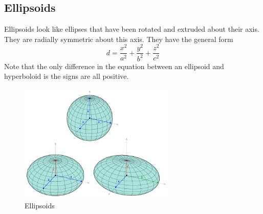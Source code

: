 \subsection{Ellipsoids}
\noindent
Ellipsoids look like ellipses that have been rotated and extruded about their axis.
They are radially symmetric about this axis.
They have the general form 
\begin{equation*}
	d = \frac{x^2}{a^2} + \frac{y^2}{b^2} + \frac{z^2}{c^2}	
\end{equation*}
Note that the only difference in the equation between an ellipsoid and hyperboloid is the signs are all positive.

\begin{figure}[H]
	\centering
	\includegraphics[width=0.66\textwidth]{./Images/differentialMultivariableCalculus/ellipsoids.png}
	\caption{Ellipsoids}
\end{figure}